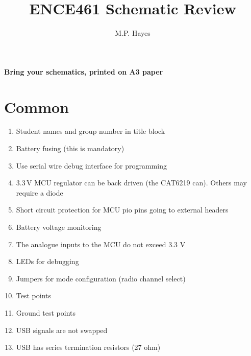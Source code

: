 \documentclass[a4paper, 12pt]{article}
\title{ENCE461 Schematic Review}
\author{M.P. Hayes}
\date{}
\begin{document}
\maketitle


\begin{center}
\textbf{Bring your schematics, printed on A3 paper}
\end{center}


\section{Common}

\begin{enumerate}
\item Student names and group number in title block

\item Battery fusing (this is mandatory)

\item Use serial wire debug interface for programming

\item 3.3\,V MCU regulator can be back driven (the CAT6219 can).  Others may require a diode

\item Short circuit protection for MCU pio pins going to external headers

\item Battery voltage monitoring

\item The analogue inputs to the MCU do not exceed 3.3 V

\item LEDs for debugging

\item Jumpers for mode configuration (radio channel select)

\item Test points

\item Ground test points

\item USB signals are not swapped

\item USB has series termination resistors (27 ohm)



\end{enumerate}
\end{document}
